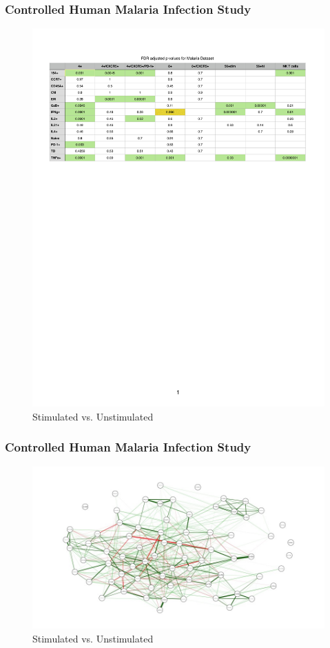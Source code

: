 \documentclass{beamer}
\theoremstyle{definition}
\begin{document}

\begin{frame}
\frametitle{Controlled Human Malaria Infection Study}
\begin{figure}[]
\includegraphics[width=12 cm]{figures/malariaQvals} \caption{Stimulated vs. Unstimulated}
\end{figure}
\end{frame}


\begin{frame}
\frametitle{Controlled Human Malaria Infection Study}
\begin{figure}[]
\includegraphics[width=12 cm]{figures/malariaGraph} \caption{Stimulated vs. Unstimulated}
\end{figure}
\end{frame}
\end{document}
